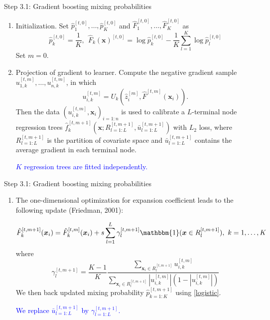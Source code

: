 \documentclass[professionalfont]{beamer}
\newcounter{saveenumi}
\newcommand{\seti}{\setcounter{saveenumi}{\value{enumi}}}
\newcommand{\conti}{\setcounter{enumi}{\value{saveenumi}}}
\def\bx{\boldsymbol{x}}
\newcommand{\blue}[1]{\textcolor{blue}{#1}}
\begin{document}
\begin{frame}{Step 3.1: Gradient boosting mixing probabilities}
	\begin{enumerate}
		\item Initialization. Set $\hat{p}_1^{[t,0]}, \ldots, \hat{p}_K^{[t,0]}$ and $\hat{F}_1^{[t,0]}, \ldots, \hat{F}_{K}^{[t,0]}$ as
		$$\hat{p}_k^{[t,0]}=\frac{1}{K}, 
		~~\hat{F}_k(\bx)^{[t,0]}=\log \hat{p}_k^{[t,0]}-\frac{1}{K}\sum_{l=1}^K\log \hat{p}_l^{[t,0]}$$
	Set $m=0$.
		\item Projection of gradient to learner. 		
		Compute the negative gradient sample $u_{1,k}^{[t,m]},\ldots,u_{n,k}^{[t,m]}$,  in which 
		$$u_{i,k}^{[t,m]}=U_k(\hat{z}_{i}^{[m]},\hat{F}^{[t,m]}(\bx_i)).$$
		Then the data $(u_{i,k}^{[t,m]},\bx_i)_{i=1:n}$ is used to calibrate a $L$-terminal node regression trees $\hat{f}_k^{[t,m+1]}\left(\bx;R^{[t,m+1]}_{l=1:L},\bar{u}^{[t,m+1]}_{l=1:L}\right)$ with $L_2$ loss,
		where $R^{[t,m+1]}_{l=1:L}$ is the partition of covariate space and $\bar{u}^{[t,m+1]}_{l=1:L}$ contains the average gradient in each terminal node. 
		
		\blue{$K$ regression trees are fitted independently.}
		\seti
	\end{enumerate}
\end{frame}

\begin{frame}{Step 3.1: Gradient boosting mixing probabilities}
	\begin{enumerate}
		\conti
		\item  The one-dimensional optimization for expansion coefficient leads to the following update (Friedman, 2001):
		 	
		$$\hat{F}_k^{[t,m+1]}(\bx_i)=\hat{F}_k^{[t,m]}(\bx_i)+s\sum_{l=1}^L\gamma^{[t,m+1]}_l\mathbbm{1}(\bx\in R^{[t,m+1]}_l),~ k=1,\ldots,K$$
		where
		$$\gamma^{[t,m+1]}_l=\frac{K-1}{K}\frac{\sum_{\bx_i\in R_l^{[t,m+1]}}u_{i,k}^{[t,m]}}{\sum_{\bx_i\in R_l^{[t,m+1]}}|u_{i,k}^{[t,m]}|(1-|u_{i,k}^{[t,m]}|)}$$
		We then back updated mixing probability $\hat{p}^{[t,m+1]}_{k=1:K}$  using \eqref{logistic}. 
		
		\blue{We replace $\bar{u}^{[t,m+1]}_{l=1:L}$ by $\gamma^{[t,m+1]}_{l=1:L}$.}
	\end{enumerate}
\end{frame}
\end{document}
